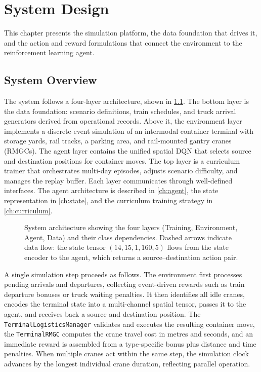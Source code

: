 \chapter{System Design}
\label{ch:system}

This chapter presents the simulation platform, the data foundation that drives it, and the action and reward formulations that connect the environment to the reinforcement learning agent.

\section{System Overview}
\label{sec:sys:overview}

The system follows a four-layer architecture, shown in \cref{fig:sys:architecture}. The bottom layer is the data foundation: scenario definitions, train schedules, and truck arrival generators derived from operational records. Above it, the environment layer implements a discrete-event simulation of an intermodal container terminal with storage yards, rail tracks, a parking area, and rail-mounted gantry cranes (RMGCs). The agent layer contains the unified spatial DQN that selects source and destination positions for container moves. The top layer is a curriculum trainer that orchestrates multi-day episodes, adjusts scenario difficulty, and manages the replay buffer. Each layer communicates through well-defined interfaces. The agent architecture is described in \cref{ch:agent}, the state representation in \cref{ch:state}, and the curriculum training strategy in \cref{ch:curriculum}.

\begin{figure}[H]
  \centering
  \resizebox{0.95\textwidth}{!}{}
  \caption{System architecture showing the four layers (Training, Environment, Agent, Data) and their class dependencies. Dashed arrows indicate data flow: the state tensor $(14, 15, 1{,}160, 5)$ flows from the state encoder to the agent, which returns a source--destination action pair.}
  \label{fig:sys:architecture}
\end{figure}

A single simulation step proceeds as follows. The environment first processes pending arrivals and departures, collecting event-driven rewards such as train departure bonuses or truck waiting penalties. It then identifies all idle cranes, encodes the terminal state into a multi-channel spatial tensor, passes it to the agent, and receives back a source and destination position. The \texttt{TerminalLogisticsManager} validates and executes the resulting container move, the \texttt{TerminalRMGC} computes the crane travel cost in metres and seconds, and an immediate reward is assembled from a type-specific bonus plus distance and time penalties. When multiple cranes act within the same step, the simulation clock advances by the longest individual crane duration, reflecting parallel operation.

